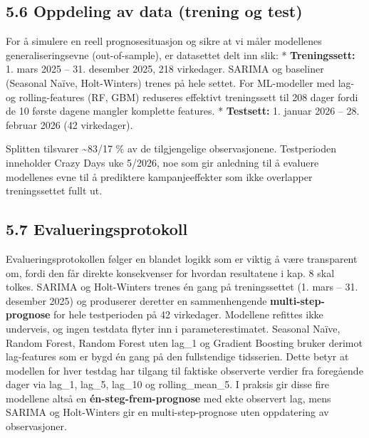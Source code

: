 \documentclass[
  norsk,
  11pt,
  a4paper,
]{article}
\begin{document}
\subsection{5.6 Oppdeling av data (trening og
test)}\label{oppdeling-av-data-trening-og-test}

For å simulere en reell prognosesituasjon og sikre at vi måler
modellenes generaliseringsevne (out-of-sample), er datasettet delt inn
slik: * \textbf{Treningssett:} 1. mars 2025 -- 31. desember 2025, 218
virkedager. SARIMA og baseliner (Seasonal Naïve, Holt-Winters) trenes på
hele settet. For ML-modeller med lag- og rolling-features (RF, GBM)
reduseres effektivt treningssett til 208 dager fordi de 10 første dagene
mangler komplette features. * \textbf{Testsett:} 1. januar 2026 -- 28.
februar 2026 (42 virkedager).

Splitten tilsvarer \textasciitilde83/17 \% av de tilgjengelige
observasjonene. Testperioden inneholder Crazy Days uke 5/2026, noe som
gir anledning til å evaluere modellenes evne til å prediktere
kampanjeeffekter som ikke overlapper treningssettet fullt ut.

\subsection{5.7 Evalueringsprotokoll}\label{evalueringsprotokoll}

Evalueringsprotokollen følger en blandet logikk som er viktig å være
transparent om, fordi den får direkte konsekvenser for hvordan
resultatene i kap. 8 skal tolkes. SARIMA og Holt-Winters trenes én gang
på treningssettet (1. mars -- 31. desember 2025) og produserer deretter
en sammenhengende \textbf{multi-step-prognose} for hele testperioden på
42 virkedager. Modellene refittes ikke underveis, og ingen testdata
flyter inn i parameterestimatet. Seasonal Naïve, Random Forest, Random
Forest uten lag\_1 og Gradient Boosting bruker derimot lag-features som
er bygd én gang på den fullstendige tidsserien. Dette betyr at modellen
for hver testdag har tilgang til faktiske observerte verdier fra
foregående dager via lag\_1, lag\_5, lag\_10 og rolling\_mean\_5. I
praksis gir disse fire modellene altså en \textbf{én-steg-frem-prognose}
med ekte observert lag, mens SARIMA og Holt-Winters gir en
multi-step-prognose uten oppdatering av observasjoner.
\end{document}
